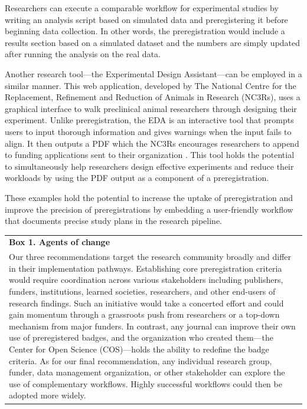\documentclass[authordate, meta]{jote-new-article}
\begin{document}
Researchers can execute a comparable workflow for experimental studies by writing an analysis script based on simulated data and preregistering it before beginning data collection. In other words, the preregistration would include a results section based on a simulated dataset and the numbers are simply updated after running the analysis on the real data.







Another research tool—the Experimental Design Assistant—can be employed in a similar manner. This web application, developed by The National Centre for the Replacement, Refinement and Reduction of Animals in Research (NC3Rs), uses a graphical interface to walk preclinical animal researchers through designing their experiment. Unlike preregistration, the EDA is an interactive tool that prompts users to input thorough information and gives warnings when the input fails to align. It then outputs a PDF which the NC3Rs encourages researchers to append to funding applications sent to their organization \parencites{NC3Rs2021}. This tool holds the potential to simultaneously help researchers design effective experiments and reduce their workloads by using the PDF output as a component of a preregistration.







These examples hold the potential to increase the uptake of preregistration and improve the precision of preregistrations by embedding a user-friendly workflow that documents precise study plans in the research pipeline.






\begin{table}[h!]
  \begin{fullwidth}
    \begin{tabularx}{\textwidth}{@{} X @{}}
      \textbf{Box 1. Agents of change} \\
      Our three recommendations target the research community broadly and differ in their implementation pathways. Establishing core preregistration criteria would require coordination across various stakeholders including publishers, funders, institutions, learned societies, researchers, and other end-users of research findings. Such an initiative would take a concerted effort and could gain momentum through a grassroots push from researchers or a top-down mechanism from major funders. In contrast, any journal can improve their own use of preregistered badges, and the organization who created them—the Center for Open Science (COS)—holds the ability to redefine the badge criteria. As for our final recommendation, any individual research group, funder, data management organization, or other stakeholder can explore the use of complementary workflows. Highly successful workflows could then be adopted more widely.
    \end{tabularx}
  \end{fullwidth}
\end{table}
\end{document}
